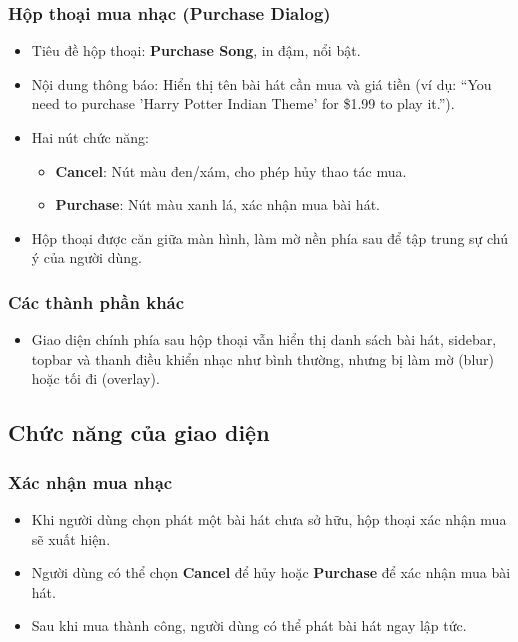 \documentclass{book}
\begin{document}
\subsubsection{Hộp thoại mua nhạc (Purchase Dialog)}
\begin{itemize}
    \item Tiêu đề hộp thoại: \textbf{Purchase Song}, in đậm, nổi bật.
    \item Nội dung thông báo: Hiển thị tên bài hát cần mua và giá tiền (ví dụ: “You need to purchase 'Harry Potter Indian Theme' for \$1.99 to play it.”).
    \item Hai nút chức năng:
    \begin{itemize}
        \item \textbf{Cancel}: Nút màu đen/xám, cho phép hủy thao tác mua.
        \item \textbf{Purchase}: Nút màu xanh lá, xác nhận mua bài hát.
    \end{itemize}
    \item Hộp thoại được căn giữa màn hình, làm mờ nền phía sau để tập trung sự chú ý của người dùng.
\end{itemize}

\subsubsection{Các thành phần khác}
\begin{itemize}
    \item Giao diện chính phía sau hộp thoại vẫn hiển thị danh sách bài hát, sidebar, topbar và thanh điều khiển nhạc như bình thường, nhưng bị làm mờ (blur) hoặc tối đi (overlay).
\end{itemize}

\subsection{Chức năng của giao diện}

\subsubsection{Xác nhận mua nhạc}
\begin{itemize}
    \item Khi người dùng chọn phát một bài hát chưa sở hữu, hộp thoại xác nhận mua sẽ xuất hiện.
    \item Người dùng có thể chọn \textbf{Cancel} để hủy hoặc \textbf{Purchase} để xác nhận mua bài hát.
    \item Sau khi mua thành công, người dùng có thể phát bài hát ngay lập tức.
\end{itemize}
\end{document}
